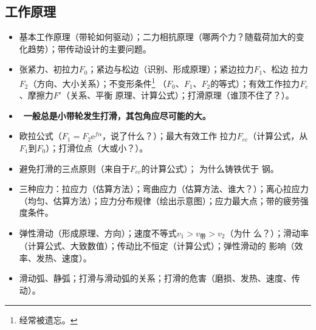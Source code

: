 \documentclass[12pt,a4paper]{article}
\newcommand{\tightlist}{\setlength{\parskip}{0pt}\setlength{\itemsep}{0pt}}
\newcommand{\hint}[1]{\textsf{（#1）}}
\newcommand{\minor}[1]{{\color{gray} #1}}
\renewcommand{\emph}[1]{\faIcon[regular]{lightbulb}\ \textbf{#1}}
\begin{document}
\subsection{工作原理}
\begin{itemize}\tightlist
    \item 基本工作原理\hint{带轮如何驱动}；二力相抗原理\hint{哪两个力？随载荷加大的变
    化趋势}；带传动设计的主要问题。
    \item 张紧力、初拉力$F_0$；紧边与松边\hint{识别、形成原理}；紧边拉力$F_1$、松边
    拉力$F_2$\hint{方向、大小关系}；不变形条件\footnote{经常被遗忘。}
    \hint{$F_0$、$F_1$、$F_2$的等式}；有效工作拉力$F_e$、摩擦力$F'$\hint{关系、平衡
    原理、计算公式}；打滑原理\hint{谁顶不住了？}。
    \item \emph{一般总是小带轮发生打滑，其包角应尽可能的大。}
    \item 欧拉公式\hint{$F_1=F_2\mathrm{e}^{f\alpha}$，说了什么？}；最大有效工作
    拉力$F_{ec}$\hint{计算公式，从$F_1$到$F_0$}；打滑位点\hint{大或小？}。
    \item 避免打滑的三点原则\hint{来自于$F_{ec}$的计算公式}；\minor{为什么铸铁优于
    钢。}
    \item 三种应力：拉应力\hint{估算方法}；弯曲应力\hint{估算方法、谁大？}；离心拉应力
    \hint{均匀、估算方法}；应力分布规律\hint{绘出示意图}；应力最大点；带的疲劳强度条件。
    \item 弹性滑动\hint{形成原理、方向}；速度不等式$v_1>v_\text{带}>v_2$\hint{为什
    么？}；滑动率\hint{计算公式、大致数值}；传动比不恒定\hint{计算公式}；弹性滑动的
    影响\hint{效率、发热、速度}。
    \item 滑动弧、静弧；打滑与滑动弧的关系；打滑的危害\hint{磨损、发热、速度、传动}。
\end{itemize}
\end{document}
